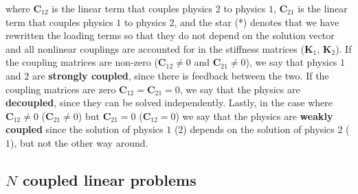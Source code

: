     where $\mathbf{C}_{12}$ is the linear term that couples physics $2$ to physics $1$,
$\mathbf{C}_{21}$ is the linear term that couples physics $1$ to physics $2$, and the
    star (*) denotes that we have rewritten the loading terms so that they do not
    depend on the solution vector and all nonlinear couplings are
    accounted for in the stiffness matrices ($\mathbf{K}_1$, $\mathbf{K}_2$). If the coupling
    matrices are non-zero ($\mathbf{C}_{12}\neq 0$ and $\mathbf{C}_{21}\neq 0$), we
    say that physics $1$ and $2$ are
    \textbf{strongly coupled}, since there is feedback between the two. If the
    coupling matrices are zero $\mathbf{C}_{12}=\mathbf{C}_{21}=0$, we say that the
    physics
    are \textbf{decoupled}, since they can be solved independently. Lastly, in the
    case where $\mathbf{C}_{12}\neq 0$ ($\mathbf{C}_{21}\neq 0$) but $\mathbf{C}_{21} = 0$ ($\mathbf{C}_{12} = 0$) we say that the
    physics are \textbf{weakly
        coupled} since the solution of physics $1$ ($2$) depends on the solution of physics
$2$ ($1$), but not the other way around.

\subsection*{$N$ coupled linear problems}


